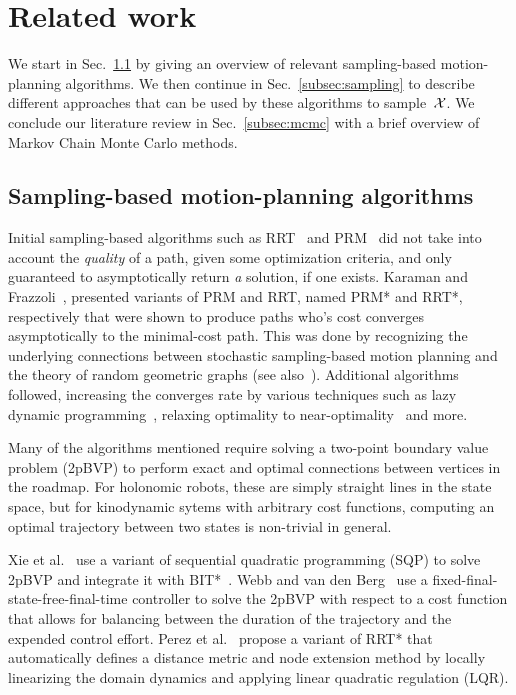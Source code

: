 \documentclass[letterpaper, 10 pt, conference]{ieeeconf}  %
\begin{document}
\section{Related work}
\label{sec:related_work}
We start in Sec.~\ref{subsec:planning} by giving an overview of relevant sampling-based motion-planning algorithms.
We then continue in Sec.~\ref{subsec:sampling} to describe different approaches that can be used by  these algorithms to sample~$\mathcal{X}$.
We conclude our literature review in Sec.~\ref{subsec:mcmc} with a brief overview of Markov Chain Monte Carlo methods.

\subsection{Sampling-based motion-planning algorithms}
\label{subsec:planning}
Initial sampling-based algorithms such as RRT~\cite{LK01} and PRM~\cite{KSLO96} did not take into account the \emph{quality} of a path, given some optimization criteria, and only guaranteed to asymptotically return \emph{a} solution, if one exists.
Karaman and Frazzoli~\cite{KF11}, presented variants of PRM and RRT, named PRM* and RRT*, respectively that were shown to produce paths who's cost converges asymptotically to the minimal-cost path.
This was done by recognizing the underlying connections between stochastic sampling-based motion planning and the theory of random geometric graphs (see also~\cite{SSH16}).
Additional algorithms followed, increasing the converges rate by various techniques such as 
lazy dynamic programming~\cite{GSB15, JSCP15, SH15},
relaxing optimality to near-optimality~\cite{DB14, SH16} 
and more.


Many of the algorithms mentioned require solving a two-point boundary value problem (2pBVP) to perform exact and optimal connections between vertices in the roadmap.
For holonomic robots, these are simply straight lines in the state space, but for kinodynamic sytems with arbitrary cost functions,  computing an optimal trajectory between two states is non-trivial in general.

Xie et al.~\cite{XBPA15} use a variant of sequential quadratic programming (SQP) to solve 2pBVP and integrate it with BIT*~\cite{GSB15}.
Webb and van den Berg~\cite{WB13} use a fixed-final-state-free-final-time controller to solve the 2pBVP  with respect to a cost function that allows for balancing between the duration of the trajectory and the expended control effort.
Perez et al.~\cite{PPKKL12} propose a variant of RRT* that automatically defines a distance metric and node extension method by locally linearizing
the domain dynamics and applying linear quadratic regulation (LQR).
\end{document}
